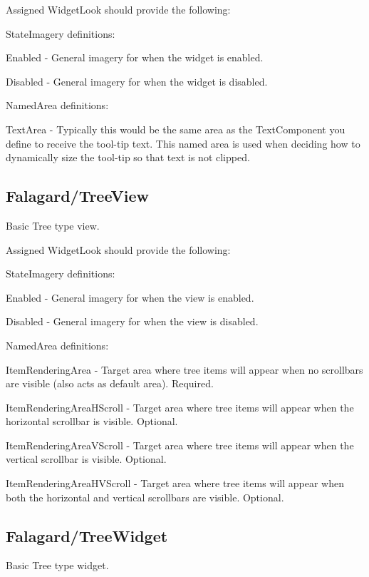 Assigned Widget\+Look should provide the following\+: 
\begin{DoxyItemize}
\item State\+Imagery definitions\+: 
\begin{DoxyItemize}
\item Enabled -\/ General imagery for when the widget is enabled. 
\item Disabled -\/ General imagery for when the widget is disabled. 
\end{DoxyItemize}


\item Named\+Area definitions\+: 
\begin{DoxyItemize}
\item Text\+Area -\/ Typically this would be the same area as the Text\+Component you define to receive the tool-\/tip text. This named area is used when deciding how to dynamically size the tool-\/tip so that text is not clipped. 
\end{DoxyItemize}
\end{DoxyItemize}\hypertarget{fal_wr_ref_fal_wr_ref_sec_28}{}\subsection{Falagard/\+Tree\+View}\label{fal_wr_ref_fal_wr_ref_sec_28}
Basic Tree type view.

Assigned Widget\+Look should provide the following\+: 
\begin{DoxyItemize}
\item State\+Imagery definitions\+: 
\begin{DoxyItemize}
\item Enabled -\/ General imagery for when the view is enabled. 
\item Disabled -\/ General imagery for when the view is disabled. 
\end{DoxyItemize}


\item Named\+Area definitions\+: 
\begin{DoxyItemize}
\item Item\+Rendering\+Area -\/ Target area where tree items will appear when no scrollbars are visible (also acts as default area). Required. 
\item Item\+Rendering\+Area\+H\+Scroll -\/ Target area where tree items will appear when the horizontal scrollbar is visible. Optional. 
\item Item\+Rendering\+Area\+V\+Scroll -\/ Target area where tree items will appear when the vertical scrollbar is visible. Optional. 
\item Item\+Rendering\+Area\+H\+V\+Scroll -\/ Target area where tree items will appear when both the horizontal and vertical scrollbars are visible. Optional. 
\end{DoxyItemize}
\end{DoxyItemize}\hypertarget{fal_wr_ref_fal_wr_ref_sec_29}{}\subsection{Falagard/\+Tree\+Widget}\label{fal_wr_ref_fal_wr_ref_sec_29}
Basic Tree type widget.


